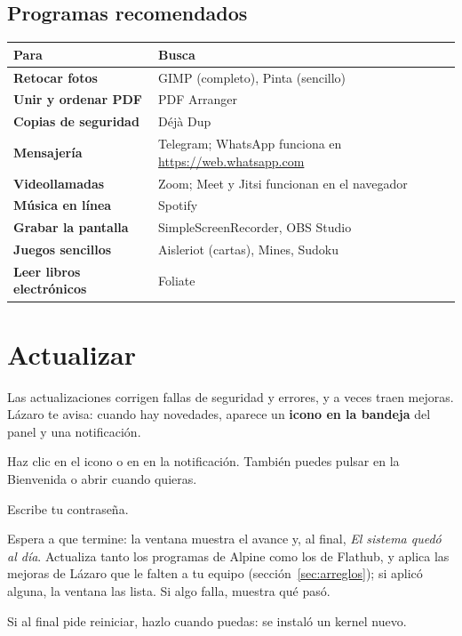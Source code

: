 \subsection{Programas recomendados}
\begin{center}
\begin{tabularx}{\textwidth}{>{\bfseries}lX}
\toprule
Para & Busca \\
\midrule
Retocar fotos & GIMP (completo), Pinta (sencillo) \\
Unir y ordenar PDF & PDF Arranger \\
Copias de seguridad & Déjà Dup \\
Mensajería & Telegram; WhatsApp funciona en \url{https://web.whatsapp.com} \\
Videollamadas & Zoom; Meet y Jitsi funcionan en el navegador \\
Música en línea & Spotify \\
Grabar la pantalla & SimpleScreenRecorder, OBS Studio \\
Juegos sencillos & Aisleriot (cartas), Mines, Sudoku \\
Leer libros electrónicos & Foliate \\
\bottomrule
\end{tabularx}
\end{center}

\section{Actualizar}\label{sec:actualizar}


Las actualizaciones corrigen fallas de seguridad y errores, y a veces
traen mejoras. Lázaro te avisa: cuando hay novedades, aparece un
\textbf{icono en la bandeja} del panel y una notificación.

\begin{pasos}
  \item Haz clic en el icono o en  en la
        notificación. También puedes pulsar  en la
        Bienvenida o abrir  cuando quieras.
  \item Escribe tu contraseña.
  \item Espera a que termine: la ventana muestra el avance y, al final,
        \emph{El sistema quedó al día}. Actualiza tanto los programas de
        Alpine como los de Flathub, y aplica las mejoras de Lázaro que
        le falten a tu equipo (sección~\ref{sec:arreglos}); si aplicó
        alguna, la ventana las lista. Si algo falla, 
        muestra qué pasó.
  \item Si al final pide reiniciar, hazlo cuando puedas:
        se instaló un kernel nuevo.
\end{pasos}

